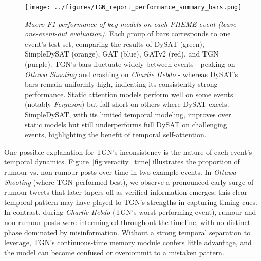 \documentclass{cshonours}
\begin{document}
\begin{figure}[htbp]

\centering

\texttt{[image: ../figures/TGN\_report\_performance\_summary\_bars.png]}

\caption[Performance by event for each model]{\textit{Macro-F1 performance of key models on each PHEME event (leave-one-event-out evaluation).} Each group of bars corresponds to one event's test set, comparing the results of DySAT (green), SimpleDySAT (orange), GAT (blue), GATv2 (red), and TGN (purple). TGN's bars fluctuate widely between events - peaking on \emph{Ottawa Shooting} and crashing on \emph{Charlie Hebdo} - whereas DySAT's bars remain uniformly high, indicating its consistently strong performance. Static attention models perform well on some events (notably \emph{Ferguson}) but fall short on others where DySAT excels. SimpleDySAT, with its limited temporal modeling, improves over static models but still underperforms full DySAT on challenging events, highlighting the benefit of temporal self-attention.}

\label{fig:tgn_bars}

\end{figure}



One possible explanation for TGN's inconsistency is the nature of each event's temporal dynamics. Figure~\ref{fig:veracity_time} illustrates the proportion of rumour vs. non-rumour posts over time in two example events. In \emph{Ottawa Shooting} (where TGN performed best), we observe a pronounced early surge of rumour tweets that later tapers off as verified information emerges; this clear temporal pattern may have played to TGN's strengths in capturing timing cues. In contrast, during \emph{Charlie Hebdo} (TGN's worst-performing event), rumour and non-rumour posts were intermingled throughout the timeline, with no distinct phase dominated by misinformation. Without a strong temporal separation to leverage, TGN's continuous-time memory module confers little advantage, and the model can become confused or overcommit to a mistaken pattern.
\end{document}
